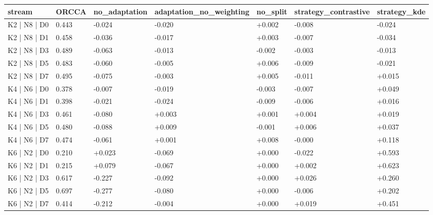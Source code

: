 \begin{tabular}{lllllll}
\hline
 stream       & ORCCA   & no\_adaptation   & adaptation\_no\_weighting   & no\_split   & strategy\_contrastive   & strategy\_kde   \\
\hline
 K2 | N8 | D0 & 0.443   & -0.024          & -0.020                    & +0.002     & -0.008                 & -0.024         \\
 K2 | N8 | D1 & 0.458   & -0.036          & -0.017                    & +0.003     & -0.007                 & -0.034         \\
 K2 | N8 | D3 & 0.489   & -0.063          & -0.013                    & -0.002     & -0.003                 & -0.013         \\
 K2 | N8 | D5 & 0.483   & -0.060          & -0.005                    & +0.006     & -0.009                 & -0.021         \\
 K2 | N8 | D7 & 0.495   & -0.075          & -0.003                    & +0.005     & -0.011                 & +0.015         \\
 K4 | N6 | D0 & 0.378   & -0.007          & -0.019                    & -0.003     & -0.007                 & +0.049         \\
 K4 | N6 | D1 & 0.398   & -0.021          & -0.024                    & -0.009     & -0.006                 & +0.016         \\
 K4 | N6 | D3 & 0.461   & -0.080          & +0.003                    & +0.001     & +0.004                 & +0.019         \\
 K4 | N6 | D5 & 0.480   & -0.088          & +0.009                    & -0.001     & +0.006                 & +0.037         \\
 K4 | N6 | D7 & 0.474   & -0.061          & +0.001                    & +0.008     & -0.000                 & +0.118         \\
 K6 | N2 | D0 & 0.210   & +0.023          & -0.069                    & +0.000     & -0.022                 & +0.593         \\
 K6 | N2 | D1 & 0.215   & +0.079          & -0.067                    & +0.000     & +0.002                 & +0.623         \\
 K6 | N2 | D3 & 0.617   & -0.227          & -0.092                    & +0.000     & +0.026                 & +0.260         \\
 K6 | N2 | D5 & 0.697   & -0.277          & -0.080                    & +0.000     & -0.006                 & +0.202         \\
 K6 | N2 | D7 & 0.414   & -0.212          & -0.004                    & +0.000     & +0.019                 & +0.451         \\
\hline
\end{tabular}